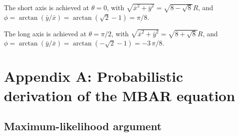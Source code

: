 \documentclass[aip,jcp,preprint,notitlepage, superscriptaddress]{revtex4-1}
\begin{document}
The short axis is achieved at $\theta = 0$,
with
$\sqrt{ {\bar x}^2 + {\bar y}^2 } = \sqrt{ 8 - \sqrt 8 } R$,
and
$\phi = \arctan(\bar y/\bar x) = \arctan \left(\sqrt 2 - 1\right) = \pi/8$.



The long axis is achieved at $\theta = \pi/2$,
with
$\sqrt{ {\bar x}^2 + {\bar y}^2 } = \sqrt{ 8 + \sqrt 8 } R$,
and
$\phi = \arctan(\bar y/\bar x) = \arctan \left(-\sqrt 2 - 1\right) = -3 \, \pi/8$.




\section{Appendix A: Probabilistic derivation of the MBAR equation}



\subsection{Maximum-likelihood argument}
\end{document}
